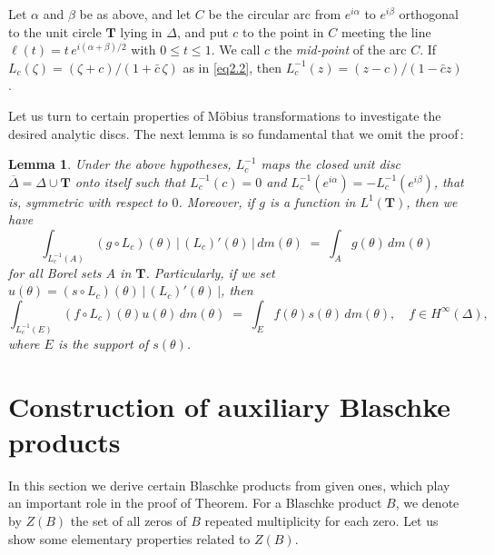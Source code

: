 \documentclass[12pt]{amsart}
\theoremstyle{plain}
\newtheorem{lem}{Lemma}[section]
\numberwithin{equation}{section}
\begin{document}
\medskip
Let $\alpha$ and $\beta$ be as above, and let $C$ be
the circular arc from $e^{i\alpha}$ to $e^{i\beta}$ orthogonal
to the unit circle $\mathbf{T}$ lying in $\Delta$, and
put $c$ to the point in $C$ meeting the line
$\ell(t)=t\,e^{i(\alpha+\beta)/2}$ with $0\leq t \leq 1$.
We call $c$ the {\it mid-point} of the arc $C$. If $L_c(\zeta)=(\zeta+c)/(1+\bar{c}\,\zeta)$ as in \eqref{eq2.2},
then $L^{-1}_c(z)=(z-c)/(1-\bar{c}z)$.


\medskip
Let us turn to certain properties of M\"{o}bius transformations
to investigate the desired analytic discs.
The next lemma is so fundamental that we omit the proof\,:

\begin{lem}
\label{lem3.3}
Under the above hypotheses, $L^{-1}_c$ maps the closed unit disc $\overline{\Delta}=\Delta \cup \mathbf{T}$ onto itself such that
$L^{-1}_c(c)=0$ and $L^{-1}_c(e^{i\alpha})= -L^{-1}_c(e^{i\beta})$,
that is, symmetric with respect to $0$. Moreover, if $g$ is
a function in $L^1(\mathbf{T})$, then we have
\begin{equation}
\label{eq3.6}
\int_{L^{-1}_c(A)} (g\circ L_c)(\theta)\,\vert \,(L_c)'(\theta)\,\vert
\,dm(\theta)\;=\;\int_A g(\theta)\,dm(\theta)
\end{equation}
for all Borel sets $A$ in $\mathbf{T}$. Particularly, if we set
$u(\theta)=(s\circ L_c)(\theta)\,\vert\, (L_c)'(\theta)\,\vert$,
then
\begin{equation*}
\int_{L^{-1}_c(E)} (f\circ L_c)(\theta)u(\theta)\,dm(\theta)\;=\;
\int_E f(\theta)s(\theta)\,dm(\theta),\quad f \in H^\infty(\Delta),
\end{equation*}
where $E$ is the support of $s(\theta)$.
\end{lem}










\bigskip
\bigskip
\section{Construction of auxiliary Blaschke products}
\label{S4}

In this section we derive certain Blaschke products from
given ones, which play an important role in the proof of
Theorem. For a Blaschke product $B$, we denote by $Z(B)$ the
set of all zeros of $B$ repeated multiplicity for each zero.
Let us show some elementary properties related to $Z(B)$.
\end{document}
